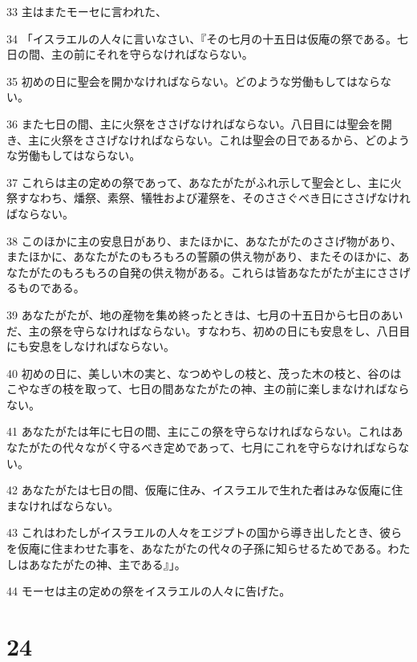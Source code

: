 \par 33 主はまたモーセに言われた、
\par 34 「イスラエルの人々に言いなさい、『その七月の十五日は仮庵の祭である。七日の間、主の前にそれを守らなければならない。
\par 35 初めの日に聖会を開かなければならない。どのような労働もしてはならない。
\par 36 また七日の間、主に火祭をささげなければならない。八日目には聖会を開き、主に火祭をささげなければならない。これは聖会の日であるから、どのような労働もしてはならない。
\par 37 これらは主の定めの祭であって、あなたがたがふれ示して聖会とし、主に火祭すなわち、燔祭、素祭、犠牲および灌祭を、そのささぐべき日にささげなければならない。
\par 38 このほかに主の安息日があり、またほかに、あなたがたのささげ物があり、またほかに、あなたがたのもろもろの誓願の供え物があり、またそのほかに、あなたがたのもろもろの自発の供え物がある。これらは皆あなたがたが主にささげるものである。
\par 39 あなたがたが、地の産物を集め終ったときは、七月の十五日から七日のあいだ、主の祭を守らなければならない。すなわち、初めの日にも安息をし、八日目にも安息をしなければならない。
\par 40 初めの日に、美しい木の実と、なつめやしの枝と、茂った木の枝と、谷のはこやなぎの枝を取って、七日の間あなたがたの神、主の前に楽しまなければならない。
\par 41 あなたがたは年に七日の間、主にこの祭を守らなければならない。これはあなたがたの代々ながく守るべき定めであって、七月にこれを守らなければならない。
\par 42 あなたがたは七日の間、仮庵に住み、イスラエルで生れた者はみな仮庵に住まなければならない。
\par 43 これはわたしがイスラエルの人々をエジプトの国から導き出したとき、彼らを仮庵に住まわせた事を、あなたがたの代々の子孫に知らせるためである。わたしはあなたがたの神、主である』」。
\par 44 モーセは主の定めの祭をイスラエルの人々に告げた。

\chapter{24}

